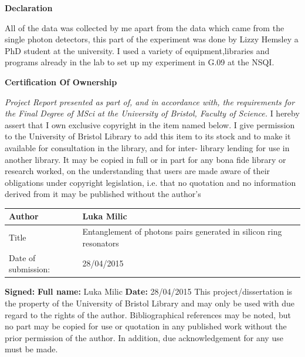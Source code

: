 \documentclass[11pt]{article}
\numberwithin{equation}{section}
\numberwithin{figure}{section}
\begin{document}
\begin{center}
{\bf Declaration }
\end{center}
All of the data was collected by me apart from the data which came from the single photon detectors, this part of the experiment was done by Lizzy Hemsley a PhD student at the university. I used a variety of equipment,libraries and programs already in the lab to set up my experiment in G.09 at the NSQI. 
\newline\newline
\begin{center}
{\bf Certification Of Ownership }
\end{center}
\textit{Project Report presented as part of, and in accordance with, the requirements for the Final Degree of
MSci at the University of Bristol, Faculty of Science.}\newline
I hereby assert that I own exclusive copyright in the item named below. I give permission to the University of
Bristol Library to add this item to its stock and to make it available for consultation in the library, and for inter-
library lending for use in another library. It may be copied in full or in part for any bona fide library or research
worked, on the understanding that users are made aware of their obligations under copyright legislation, i.e. that
no quotation and no information derived from it may be published without the author’s 

\begin{table}[h]
\begin{tabular}{|l|l|l|}
\hline
Author              & Luka Milic                                                         \\ \hline
Title               & Entanglement of photons pairs generated in silicon ring resonators \\ \hline
Date of submission: & 28/04/2015                                                         \\ \hline
\end{tabular}
\end{table}
\noindent
\textbf{Signed:}
\newline
\textbf{Full name:} Luka Milic
\newline
\textbf{Date:} 28/04/2015
\newline
\newline
This project/dissertation is the property of the University of Bristol Library and may only be used with due regard
to the rights of the author. Bibliographical references may be noted, but no part may be copied for use or
quotation in any published work without the prior permission of the author. In addition, due acknowledgement
for any use must be made.


\newpage
\tableofcontents
\newpage






\newpage
%


\newpage
\appendix 




\end{document}
